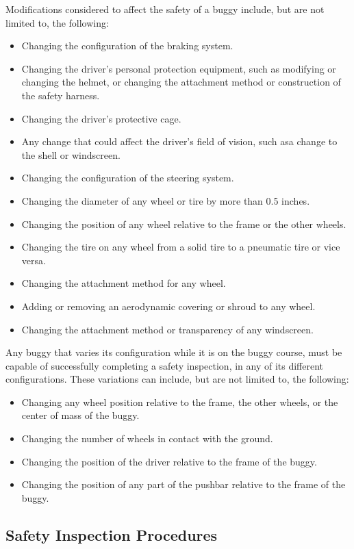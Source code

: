 \documentclass[openany]{book}
\begin{document}
Modifications considered to affect the safety of a buggy include, but are not limited to, the following:
\begin{itemize}
	\item Changing the configuration of the braking system.
	\item Changing the driver's personal protection equipment, such as modifying or changing the helmet, or changing the attachment method or construction of the safety harness.
	\item Changing the driver's protective cage.
	\item Any change that could affect the driver's field of vision, such asa change to the shell or windscreen.
	\item Changing the configuration of the steering system.
	\item Changing the diameter of any wheel or tire by more than 0.5 inches.
	\item Changing the position of any wheel relative to the frame or the other wheels.
	\item Changing the tire on any wheel from a solid tire to a pneumatic tire or vice versa.
	\item Changing the attachment method for any wheel.
	\item Adding or removing an aerodynamic covering or shroud to any wheel.
	\item Changing the attachment method or transparency of any windscreen.
\end{itemize}

Any buggy that varies its configuration while it is on the buggy course, must be capable of successfully completing a safety inspection, in any of its different configurations. These variations can include, but are not limited to, the following:
\begin{itemize}
	\item Changing any wheel position relative to the frame, the other wheels, or the center of mass of the buggy.
	\item Changing the number of wheels in contact with the ground.
	\item Changing the position of the driver relative to the frame of the buggy.
	\item Changing the position of any part of the pushbar relative to the frame of the buggy.
\end{itemize}

\subsection{Safety Inspection Procedures}
\end{document}
